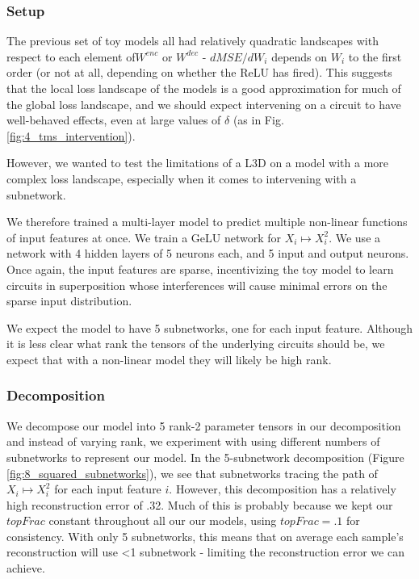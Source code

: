\documentclass{article}
\theoremstyle{plain}
\theoremstyle{definition}
\theoremstyle{remark}
\begin{document}
\subsubsection{Setup}

The previous set of toy models all had relatively quadratic landscapes with respect to each element of$W^{enc}$ or $W^{dec}$ - $dMSE/dW_i$ depends on $W_i$ to the first order (or not at all, depending on whether the ReLU has fired). This suggests that the local loss landscape of the models is a good approximation for much of the global loss landscape, and we should expect intervening on a circuit to have well-behaved effects, even at large values of $\delta$ (as in Fig. \ref{fig:4_tms_intervention}). 

However, we wanted to test the limitations of a L3D on a model with a more complex loss landscape, especially when it comes to intervening with a subnetwork.

We therefore trained a multi-layer model to predict multiple non-linear functions of input features at once. We train a GeLU network for $X_i \mapsto X_i^2$. We use a network with 4 hidden layers of 5 neurons each, and 5 input and output neurons. Once again, the input features are sparse, incentivizing the toy model to learn circuits in superposition whose interferences will cause minimal errors on the sparse input distribution. 

We expect the model to have 5 subnetworks, one for each input feature. Although it is less clear what rank the tensors of the underlying circuits should be, we expect that with a non-linear model they will likely be high rank. 

\subsubsection{Decomposition}

We decompose our model into 5 rank-2 parameter tensors in our decomposition and instead of varying rank, we experiment with using different numbers of subnetworks to represent our model. In the 5-subnetwork decomposition (Figure \ref{fig:8_squared_subnetworks}), we see that subnetworks tracing the path of $X_i \mapsto X_i^2$ for each input feature $i$. However, this decomposition has a relatively high reconstruction error of .32. Much of this is probably because we kept our $topFrac$ constant throughout all our our models, using $topFrac=.1$ for consistency.  With only 5 subnetworks, this means that on average each sample's reconstruction will use <1 subnetwork - limiting the reconstruction error we can achieve. 
\end{document}
